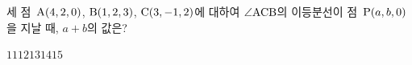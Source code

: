 세 점~$\mathrm{A}(4{,}\mkern3mu\mathopen{}2{,}\mkern3mu\mathopen{}0)$, $\mathrm{B}(1{,}\mkern3mu\mathopen{}2{,}\mkern3mu\mathopen{}3)$, $\mathrm{C}(3{,}\mkern3mu\mathopen{}-1{,}\mkern3mu\mathopen{}2)$에 대하여 $\angle\mathrm{ACB}$의 이등분선이 점~$\mathrm{P}(a{,}\mkern3mu\mathopen{}b{,}\mkern3mu\mathopen{}0)$을 지날 때, $a+b$의 값은?
\begin{choices32}{$11$}{$12$}{$13$}{$14$}{$15$}\end{choices32}

